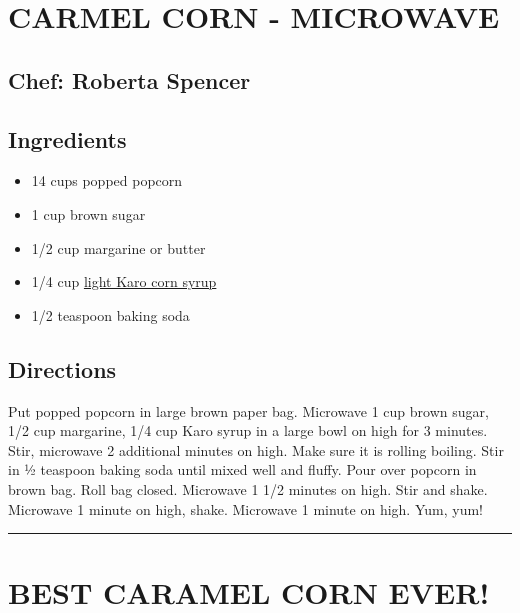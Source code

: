 \documentclass[
]{book}
\providecommand{\tightlist}{%
  \setlength{\itemsep}{0pt}\setlength{\parskip}{0pt}}
\begin{document}
\hypertarget{carmel-corn---microwave}{%
\section*{CARMEL CORN - MICROWAVE}\label{carmel-corn---microwave}}


\hypertarget{chef-roberta-spencer-34}{%
\subsection*{Chef: Roberta Spencer}\label{chef-roberta-spencer-34}}


\hypertarget{ingredients-96}{%
\subsection*{Ingredients}\label{ingredients-96}}


\begin{itemize}
\tightlist
\item
  14 cups popped popcorn
\item
  1 cup brown sugar
\item
  1/2 cup margarine or butter
\item
  1/4 cup \href{https://en.wikipedia.org/wiki/Corn_syrup}{light Karo corn syrup}
\item
  1/2 teaspoon baking soda
\end{itemize}

\hypertarget{directions-96}{%
\subsection*{Directions}\label{directions-96}}


Put popped popcorn in large brown paper bag. Microwave 1 cup brown sugar, 1/2 cup margarine, 1/4 cup Karo syrup in a large bowl on high for 3 minutes. Stir, microwave 2 additional minutes on high. Make sure it is rolling boiling. Stir in ½ teaspoon baking soda until mixed well and fluffy. Pour over popcorn in brown bag. Roll bag closed. Microwave 1 1/2 minutes on high. Stir and shake. Microwave 1 minute on high, shake. Microwave 1 minute on high. Yum, yum!

\begin{center}\rule{0.5\linewidth}{0.5pt}\end{center}

\hypertarget{best-caramel-corn-ever}{%
\section*{BEST CARAMEL CORN EVER!}\label{best-caramel-corn-ever}}
\end{document}
